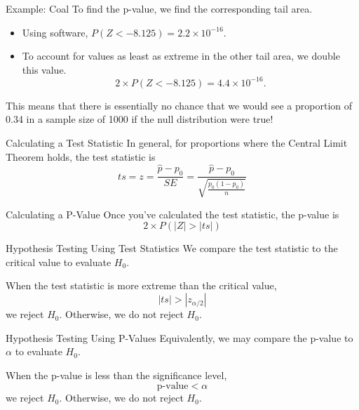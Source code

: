 \begin{frame}{Example: Coal}
    To find the p-value, we find the corresponding tail area. 
    \begin{itemize}
        \item Using software, $P(Z < -8.125) = 2.2 \times 10^{−16}$.
        \item To account for values as least as extreme in the other tail area, we double this value.
        \[
            2\times P(Z < -8.125) = 4.4 \times 10^{−16}.
        \]
    \end{itemize}
    
    \vspace{12pt}This means that there is essentially no chance that we would see a proportion of 0.34 in a sample size of 1000 if the null distribution were true!
\end{frame}

\begin{frame}{Calculating a Test Statistic}
    In general, for proportions where the Central Limit Theorem holds, the test statistic is
    \[
        ts = z = \frac{\hat{p}-p_0}{SE} =  \frac{\hat{p}-p_0}{\sqrt{\frac{p_0(1-p_0)}{n}}}
    \]
\end{frame}

\begin{frame}{Calculating a P-Value}
    Once you've calculated the test statistic, the p-value is
    \[
        2\times P(|Z| > |ts|)
    \]
\end{frame}

\begin{frame}{Hypothesis Testing Using Test Statistics}
    We compare the test statistic to the critical value to evaluate $H_0$.
    
    \vspace{12pt}When the test statistic is more extreme than the critical value, 
    \[
        |ts| > |z_{\alpha/2}|
    \]
    we reject $H_0$. Otherwise, we do not reject $H_0$.
\end{frame}

\begin{frame}{Hypothesis Testing Using P-Values}
    Equivalently, we may compare the p-value to $\alpha$ to evaluate $H_0$.
    
    \vspace{12pt}When the p-value is less than the significance level,
    \[
        \text{p-value} < \alpha
    \]
        we reject $H_0$. Otherwise, we do not reject $H_0$.
\end{frame}

